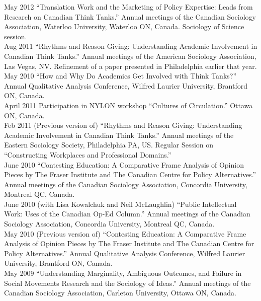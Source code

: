 \documentclass[11pt,usenames,dvipsnames]{article}
\begin{document}
\ind May 2012 ``Translation Work and the Marketing of Policy Expertise: Leads from Research on Canadian Think Tanks.'' Annual meetings of the Canadian Sociology Association, Waterloo University, Waterloo ON, Canada. Sociology of Science session.\\

\ind Aug 2011 ``Rhythms and Reason Giving: Understanding Academic Involvement in Canadian Think Tanks.'' Annual meetings of the American Sociology Association, Las Vegas, NV. Refinement of a paper presented in Philadelphia earlier that year. \\

\ind May 2010 ``How and Why Do Academics Get Involved with Think Tanks?'' Annual Qualitative Analysis Conference, Wilfred Laurier University, Brantford ON, Canada.\\

\ind April 2011 Participation in NYLON workshop ``Cultures of Circulation.'' Ottawa ON, Canada.\\

\ind Feb 2011 (Previous version of) ``Rhythms and Reason Giving: Understanding Academic Involvement in Canadian Think Tanks.'' Annual meetings of the Eastern Sociology Society, Philadelphia PA, US. Regular Session on ``Constructing Workplaces and Professional Domains.''\\

\ind June 2010 ``Contesting Education: A Comparative Frame Analysis of Opinion Pieces by The Fraser Institute and The Canadian Centre for Policy Alternatives.'' Annual meetings  of the Canadian Sociology Association, Concordia University, Montreal QC, Canada.\\

\ind June 2010 (with Lisa Kowalchuk and Neil McLaughlin) ``Public Intellectual Work: Uses of the Canadian Op-Ed Column.'' Annual meetings of the Canadian Sociology Association, Concordia University, Montreal QC, Canada.\\

\ind May 2010 (Previous version of) ``Contesting Education: A Comparative Frame Analysis of Opinion Pieces by The Fraser Institute and The Canadian Centre for Policy Alternatives.'' Annual Qualitative Analysis Conference, Wilfred Laurier University, Brantford ON, Canada.\\

\ind May 2009 ``Understanding Marginality, Ambiguous Outcomes, and Failure in Social Movements Research and the Sociology of Ideas.'' Annual meetings of the Canadian Sociology Association, Carleton University, Ottawa ON, Canada.\\
\end{document}
